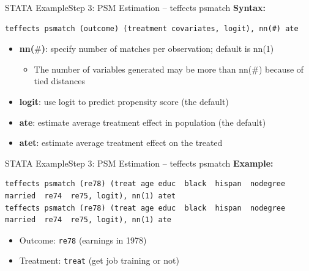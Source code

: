 \documentclass[dvipsnames,hyperref={pdfpagelabels=false}]{beamer}
\begin{document}
\begin{frame}[fragile]{STATA Example}{Step 3: PSM Estimation -- teffects psmatch}
	\textbf{Syntax:}
\begin{lstlisting}
teffects psmatch (outcome) (treatment covariates, logit), nn(#) ate
\end{lstlisting}
	\begin{itemize}
		\vspace{0.2cm}
		\item \textbf{nn($\#$)}: specify number of matches per observation; default is nn(1)
		\vspace{0.2cm}
			\begin{itemize}
		\item The number of variables generated may be more than nn($\#$) because of tied distances
			\end{itemize}
		\vspace{0.2cm}
		\item \textbf{logit}: use logit to predict propensity score (the default)
		\vspace{0.2cm}
		\item \textbf{ate}: estimate average treatment effect in population (the default)
		\vspace{0.2cm}
		\item \textbf{atet}: estimate average treatment effect on the treated  
		
	\end{itemize}
\end{frame}


\begin{frame}[fragile]{STATA Example}{Step 3: PSM Estimation -- teffects psmatch}
	\textbf{Example:}
\begin{lstlisting}
teffects psmatch (re78) (treat age educ  black  hispan  nodegree  married  re74  re75, logit), nn(1) atet
teffects psmatch (re78) (treat age educ  black  hispan  nodegree  married  re74  re75, logit), nn(1) ate
\end{lstlisting}
	\begin{itemize}
		\vspace{0.2cm}
		\item Outcome: \texttt{re78} (earnings in 1978)
		\vspace{0.2cm}
		\item Treatment: \texttt{treat} (get job training or not)
	\end{itemize}
\end{frame}
\end{document}
